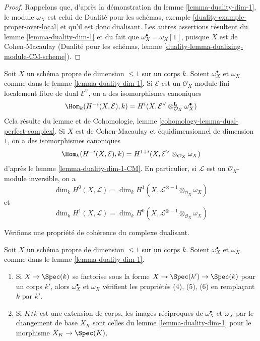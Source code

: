 \begin{proof}
Rappelons que, d'après la démonstration du lemme \ref{lemma-duality-dim-1}, le module $\omega_X$ est celui de Dualité pour les schémas, exemple \ref{duality-example-proper-over-local} et qu'il est donc dualisant. Les autres assertions résultent du lemme \ref{lemma-duality-dim-1} et du fait que $\omega_X^\bullet = \omega_X[1]$, puisque $X$ est de Cohen-Macaulay (Dualité pour les schémas, lemme \ref{duality-lemma-dualizing-module-CM-scheme}).
\end{proof}

\begin{remark}
\label{remark-rework-duality-locally-free}
Soit $X$ un schéma propre de dimension $\leq 1$ sur un corps $k$. Soient $\omega_X^\bullet$ et $\omega_X$ comme dans le lemme \ref{lemma-duality-dim-1}. Si $\mathcal{E}$ est un $\mathcal{O}_X$-module fini localement libre de dual $\mathcal{E}^\vee$, on a des isomorphismes canoniques $$
\Hom_k(H^{-i}(X, \mathcal{E}), k) =
H^i(X, \mathcal{E}^\vee \otimes_{\mathcal{O}_X}^\mathbf{L} \omega_X^\bullet)
$$ Cela résulte du lemme et de Cohomologie, lemme \ref{cohomology-lemma-dual-perfect-complex}. Si $X$ est de Cohen-Macaulay et équidimensionnel de dimension $1$, on a des isomorphismes canoniques $$
\Hom_k(H^{-i}(X, \mathcal{E}), k) =
H^{1 + i}(X, \mathcal{E}^\vee \otimes_{\mathcal{O}_X} \omega_X)
$$ d'après le lemme \ref{lemma-duality-dim-1-CM}. En particulier, si $\mathcal{L}$ est un $\mathcal{O}_X$-module inversible, on a $$
\dim_k H^0(X, \mathcal{L}) =
\dim_k H^1(X, \mathcal{L}^{\otimes -1} \otimes_{\mathcal{O}_X} \omega_X)
$$ et
$$
\dim_k H^1(X, \mathcal{L}) =
\dim_k H^0(X, \mathcal{L}^{\otimes -1} \otimes_{\mathcal{O}_X} \omega_X)
$$
\end{remark}

\noindent
Vérifions une propriété de cohérence du complexe dualisant.

\begin{lemma}
\label{lemma-sanity-check-duality}
Soit $X$ un schéma propre de dimension $\leq 1$ sur un corps $k$. Soient $\omega_X^\bullet$ et $\omega_X$ comme dans le lemme \ref{lemma-duality-dim-1}. \begin{enumerate} \item Si $X \to \Spec(k)$ se factorise sous la forme $X \to \Spec(k') \to \Spec(k)$ pour un corps $k'$, alors $\omega_X^\bullet$ et $\omega_X$ vérifient les propriétés (4), (5), (6) en remplaçant $k$ par $k'$. \item Si $K/k$ est une extension de corps, les images réciproques de $\omega_X^\bullet$ et $\omega_X$ par le changement de base $X_K$ sont celles du lemme \ref{lemma-duality-dim-1} pour le morphisme $X_K \to \Spec(K)$.
\end{enumerate}
\end{lemma}

